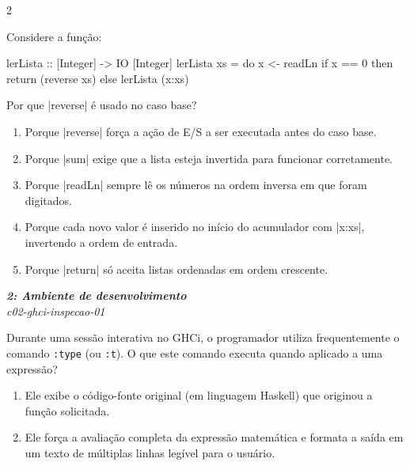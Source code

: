 \documentclass[a4paper,10pt,brazil]{article}
\begin{document}
\begin{multicols}{2}
\begin{flushright}
\end{flushright}
Considere a função:

\begin{haskellcode}
lerLista :: [Integer] -> IO [Integer]
lerLista xs = do
  x <- readLn
  if x == 0
    then return (reverse xs)
    else lerLista (x:xs)
\end{haskellcode}

Por que \haskellinline|reverse| é usado no caso base?

\begin{enumerate}
  \item Porque \haskellinline|reverse| força a ação de E/S a ser executada antes do caso base.

  \item Porque \haskellinline|sum| exige que a lista esteja invertida para funcionar corretamente.

  \item Porque \haskellinline|readLn| sempre lê os números na ordem inversa em que foram digitados.

  \item Porque cada novo valor é inserido no início do acumulador com \haskellinline|x:xs|, invertendo a ordem de entrada.

  \item Porque \haskellinline|return| só aceita listas ordenadas em ordem crescente.


\end{enumerate}

\begin{flushright}
  \footnotesize
  \textit{\textbf{2: Ambiente de desenvolvimento}}\\
  \textit{c02-ghci-inspecao-01}\\

\end{flushright}
Durante uma sessão interativa no GHCi, o programador utiliza frequentemente o comando \texttt{:type} (ou \texttt{:t}). O que este comando executa quando aplicado a uma expressão?

\begin{enumerate}
  \item Ele exibe o código-fonte original (em linguagem Haskell) que originou a função solicitada.

  \item Ele força a avaliação completa da expressão matemática e formata a saída em um texto de múltiplas linhas legível para o usuário.


\end{enumerate}
\end{multicols}
\end{document}
